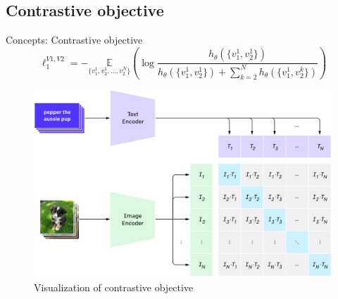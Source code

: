 \documentclass[xcolor=dvipsnames]{beamer}
\begin{document}
\subsection{Contrastive objective} %
\begin{frame}{Concepts: Contrastive objective}
  \begin{equation}
    \ell_1^{V1, V2} = - \underset{\{v_1^1, v_2^1, \ldots, v_2^N\}}{\mathbb{E}} \left( \log \frac{h_\theta(\{v_1^1,v_2^1\})}{h_\theta(\{v_1^1,v_2^1\}) + \sum_{k=2}^N h_\theta(\{v_1^1, v_2^k\})} \right)
  \end{equation}

  \vspace{1cm}

  \begin{figure}[ht]
    \begin{minipage}{0.67\textwidth}
      \centering
      \includegraphics[width=0.9\linewidth]{../../figures/02-04-text-support-img/contrastive-pre-training}
    \end{minipage}
    \begin{minipage}[c]{0.3\textwidth}
      \caption{Visualization of contrastive objective \parencite{openai2021clipblog}}
    \end{minipage}
  \end{figure}
\end{frame}
\end{document}
